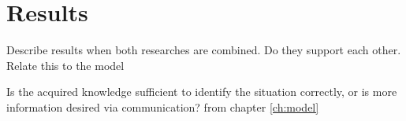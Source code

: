 \chapter{Results}
Describe results when both researches are combined. Do they support each other. Relate this to the model

Is the acquired knowledge sufficient to identify the situation correctly, or is more information desired via communication? from chapter \ref{ch:model}